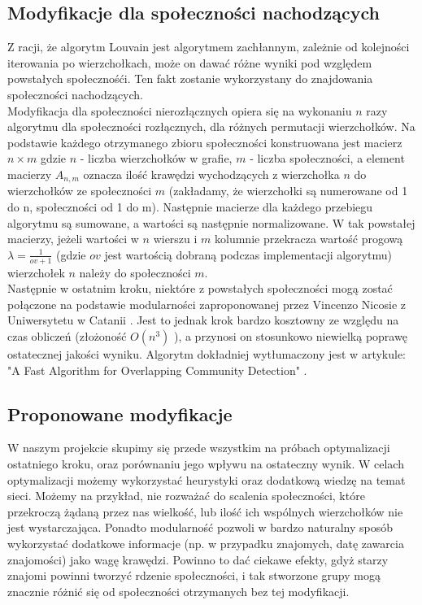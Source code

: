 \documentclass{article}
\begin{document}
\subsection{Modyfikacje dla społeczności nachodzących}
Z racji, że algorytm Louvain jest algorytmem zachłannym, zależnie od kolejności iterowania po wierzchołkach, może on dawać różne wyniki pod względem powstałych społecznośći. Ten fakt zostanie wykorzystany do znajdowania społeczności nachodzących.\\

Modyfikacja dla społeczności nierozłącznych opiera się na wykonaniu $n$ razy algorytmu dla społeczności rozłącznych, dla różnych permutacji wierzchołków. Na podstawie każdego otrzymanego zbioru społeczności konstruowana jest macierz $n \times m$ gdzie $n$ - liczba wierzchołków w grafie, $m$ - liczba społeczności, a element macierzy $A_{n,m}$ oznacza ilość krawędzi wychodzących z wierzchołka $n$ do wierzchołków ze społeczności $m$ (zakładamy, że wierzchołki są numerowane od 1 do n, społeczności od 1 do m). Następnie macierze dla każdego przebiegu algorytmu są sumowane, a wartości są następnie normalizowane. W tak powstałej macierzy, jeżeli wartości w $n$ wierszu i $m$ kolumnie przekracza wartość progową $\lambda = \frac{1}{ov + 1}$ (gdzie $ov$ jest wartością dobraną podczas implementacji algorytmu) wierzchołek $n$ należy do społeczności $m$. \\

Następnie w ostatnim kroku, niektóre z powstałych społeczności mogą zostać połączone na podstawie modularności zaproponowanej przez Vincenzo Nicosie z Uniwersytetu w Catanii \cite{pw-paper2} . Jest to jednak krok bardzo kosztowny ze względu na czas obliczeń (złożoność $O(n^3)$ ), a przynosi on stosunkowo niewielką poprawę ostatecznej jakości wyniku. Algorytm dokładniej wytłumaczony jest w artykule: "A Fast Algorithm for Overlapping Community Detection" \cite{pw-paper3}.
\subsection{Proponowane modyfikacje}
W naszym projekcie skupimy się przede wszystkim na próbach optymalizacji ostatniego kroku, oraz porównaniu jego wpływu na ostateczny wynik. W celach optymalizacji możemy wykorzystać heurystyki oraz dodatkową wiedzę na temat sieci. Możemy na przykład, nie rozważać do scalenia społeczności, które przekroczą żądaną przez nas wielkość, lub ilość ich wspólnych wierzchołków nie jest wystarczająca.
Ponadto modularność pozwoli w bardzo naturalny sposób wykorzystać dodatkowe informacje (np. w przypadku znajomych, datę zawarcia znajomości) jako wagę krawędzi. Powinno to dać ciekawe efekty, gdyż starzy znajomi powinni tworzyć rdzenie społeczności, i tak stworzone grupy mogą znacznie różnić się od społeczności otrzymanych bez tej modyfikacji.\\
\end{document}
